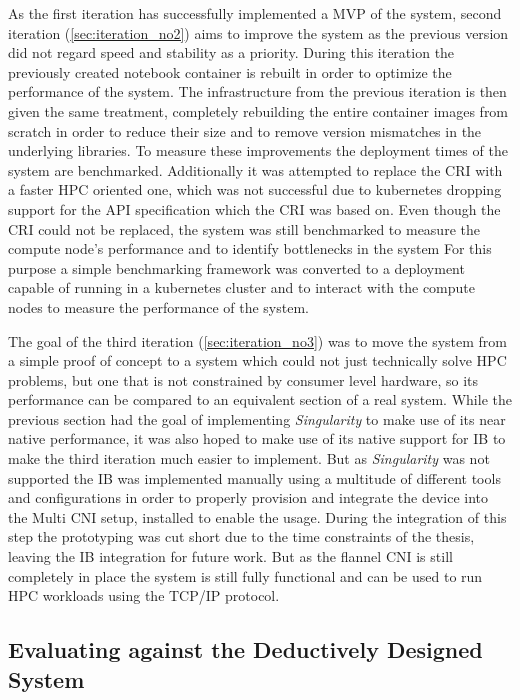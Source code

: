 As the first iteration  has successfully implemented a \ac{MVP} of the system,
second iteration (\ref{sec:iteration_no2}) aims to improve the system as
the previous version did not regard speed and stability as a priority.
During this iteration the previously created notebook container is rebuilt in
order to optimize the performance of the system.
The infrastructure from the previous iteration is then given the same treatment,
completely rebuilding the entire container images from scratch in order to
reduce their size and to remove version mismatches in the underlying libraries.
To measure these improvements the deployment times of the system are benchmarked.
Additionally it was attempted to replace the \ac{CRI} with a faster \ac{HPC} oriented
one, which was not successful due to kubernetes dropping support for the \ac{API}
specification which the \ac{CRI} was based on.
Even though the \ac{CRI} could not be replaced, the system was still benchmarked
to measure the compute node's performance and to identify bottlenecks in the system
For this purpose a simple benchmarking framework was converted to a deployment
capable of running in a kubernetes cluster and to interact with the compute nodes
to measure the performance of the system.

The goal of the third iteration (\ref{sec:iteration_no3}) was to move the system from
a simple proof of concept to a system which could not just technically solve \ac{HPC} problems,
but one that is not constrained by consumer level hardware, so its performance can be
compared to an equivalent section of a real system.
While the previous section had the goal of implementing \textit{Singularity} to
make use of its near native performance, it was also hoped to make use of its
native support for \ac{IB} to make the third iteration much easier to implement.
But as \textit{Singularity} was not supported the \ac{IB} was implemented manually
using a multitude of different tools and configurations in order to properly provision
and integrate the device into the Multi \ac{CNI} setup, installed to enable the usage.
During the integration of this step the prototyping was cut short due to the time
constraints of the thesis, leaving the \ac{IB} integration for future work.
But as the flannel \ac{CNI} is still completely in place the system is still
fully functional and can be used to run \ac{HPC} workloads using the \ac{TCP/IP} protocol.


\subsection{Evaluating against the Deductively Designed System}


